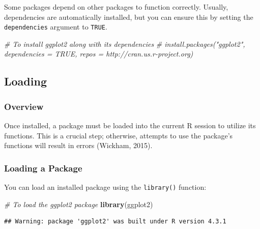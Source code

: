 \documentclass[
  b5paper]{book}
\newenvironment{Shaded}{\begin{snugshade}}{\end{snugshade}}
\newcommand{\CommentTok}[1]{\textcolor[rgb]{0.56,0.35,0.01}{\textit{#1}}}
\newcommand{\FunctionTok}[1]{\textcolor[rgb]{0.13,0.29,0.53}{\textbf{#1}}}
\newcommand{\NormalTok}[1]{#1}
\begin{document}
Some packages depend on other packages to function correctly. Usually, dependencies are automatically installed, but you can ensure this by setting the \texttt{dependencies} argument to \texttt{TRUE}.

\begin{Shaded}
\begin{Highlighting}[]
\CommentTok{\# To install ggplot2 along with its dependencies}
\CommentTok{\# install.packages("ggplot2", dependencies = TRUE, repos = \textquotesingle{}http://cran.us.r{-}project.org\textquotesingle{})}
\end{Highlighting}
\end{Shaded}

\hypertarget{loading}{%
\subsection*{Loading}\label{loading}}

\hypertarget{overview-7}{%
\subsubsection*{Overview}\label{overview-7}}

Once installed, a package must be loaded into the current R session to utilize its functions. This is a crucial step; otherwise, attempts to use the package's functions will result in errors (Wickham, 2015).

\hypertarget{loading-a-package}{%
\subsubsection*{Loading a Package}\label{loading-a-package}}

You can load an installed package using the \texttt{library()} function:

\begin{Shaded}
\begin{Highlighting}[]
\CommentTok{\# To load the ggplot2 package}
\FunctionTok{library}\NormalTok{(ggplot2)}
\end{Highlighting}
\end{Shaded}

\begin{verbatim}
## Warning: package 'ggplot2' was built under R version 4.3.1
\end{verbatim}
\end{document}
